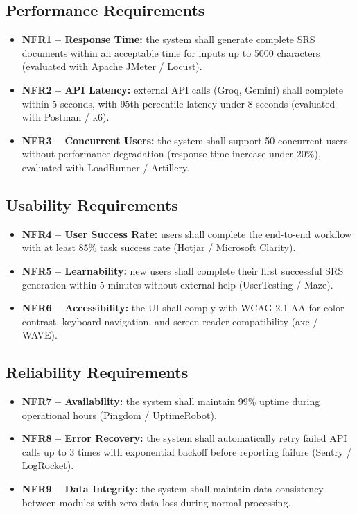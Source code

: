 \documentclass[12pt,a4paper,oneside]{report}
\begin{document}
\subsection{Performance Requirements}
\begin{itemize}[leftmargin=*]
  \item \textbf{NFR1 -- Response Time:} the system shall generate complete SRS documents within an acceptable time for inputs up to 5000 characters (evaluated with Apache JMeter / Locust).
  \item \textbf{NFR2 -- API Latency:} external API calls (Groq, Gemini) shall complete within 5 seconds, with 95th-percentile latency under 8 seconds (evaluated with Postman / k6).
  \item \textbf{NFR3 -- Concurrent Users:} the system shall support 50 concurrent users without performance degradation (response-time increase under 20\%), evaluated with LoadRunner / Artillery.
\end{itemize}

\subsection{Usability Requirements}
\begin{itemize}[leftmargin=*]
  \item \textbf{NFR4 -- User Success Rate:} users shall complete the end-to-end workflow with at least 85\% task success rate (Hotjar / Microsoft Clarity).
  \item \textbf{NFR5 -- Learnability:} new users shall complete their first successful SRS generation within 5 minutes without external help (UserTesting / Maze).
  \item \textbf{NFR6 -- Accessibility:} the UI shall comply with WCAG 2.1 AA for color contrast, keyboard navigation, and screen-reader compatibility (axe / WAVE).
\end{itemize}

\subsection{Reliability Requirements}
\begin{itemize}[leftmargin=*]
  \item \textbf{NFR7 -- Availability:} the system shall maintain 99\% uptime during operational hours (Pingdom / UptimeRobot).
  \item \textbf{NFR8 -- Error Recovery:} the system shall automatically retry failed API calls up to 3 times with exponential backoff before reporting failure (Sentry / LogRocket).
  \item \textbf{NFR9 -- Data Integrity:} the system shall maintain data consistency between modules with zero data loss during normal processing.
\end{itemize}
\end{document}
